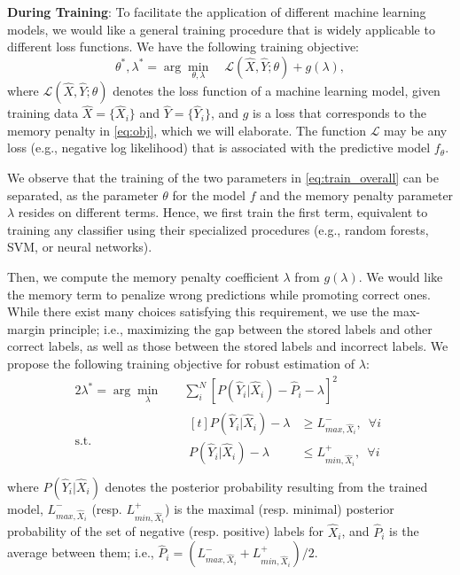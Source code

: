 \documentclass[letterpaper]{article} %
\begin{document}
\textbf{During Training}: To facilitate the application of different machine learning models, we  would like a general training procedure that is widely applicable to different loss functions. We have the following training objective: 
\begin{equation}
\label{eq:train_overall}
\theta^*, \lambda^* = \arg\min_{\theta,\lambda}  \quad \mathcal{L}(\hat{X},\hat{Y};\theta) + g(\lambda),
\end{equation}
where $\mathcal{L}(\hat{X},\hat{Y}; \theta)$ denotes the loss function of a machine learning model, given training data $\hat{X}=\{\hat{X}_i\}$ and $\hat{Y}=\{\hat{Y}_i\}$, and $g$ is a loss that corresponds to the memory penalty in \eqref{eq:obj}, which we will elaborate. The function $\mathcal{L}$ may be any loss (e.g., negative log likelihood) that is associated with the predictive model $f_{\theta}$.

We observe that the training of the two parameters in \eqref{eq:train_overall} can be separated, as the parameter $\theta$ for the model $f$ and the memory penalty parameter $\lambda$ resides on different terms. Hence, we first train the first term, equivalent to training any classifier using their specialized procedures (e.g., random forests, SVM, or neural networks). 

Then, we compute the memory penalty coefficient $\lambda$ from $g(\lambda)$. We would like the memory term to penalize wrong predictions while promoting correct ones. While there exist many  choices satisfying this requirement, we use the max-margin principle; i.e., maximizing the gap between the stored labels and other correct labels, as well as those between the stored labels and incorrect labels. We propose the following training objective for robust estimation of $\lambda$:
\begin{alignat*}{2}
 \lambda^* = \arg\min_{\lambda}  \quad & \sum_i^N [P(\hat{Y}_i|\hat{X}_i) - \hat{P}_i - \lambda]^2 \\
  \text{s.t.} \quad &  \begin{aligned}[t]
    P(\hat{Y}_i|\hat{X}_i) - \lambda & \ge L^{-}_{max, \hat{X}_i}, \,\,\,\forall i\\
    P(\hat{Y}_i|\hat{X}_i) - \lambda & \le L^{+}_{min, \hat{X}_i}, \,\,\,\forall i\\
  \end{aligned}
\end{alignat*}
where $P(\hat{Y}_i|\hat{X}_i)$ denotes the posterior probability resulting from the trained model, $L^{-}_{max, \hat{X}_i}$ (resp. $L^{+}_{min, \hat{X}_i}$) is the maximal (resp. minimal) posterior probability of the set of negative (resp. positive) labels for  $\hat{X}_i$, and $\hat{P}_i$ is the average between them; i.e., $\hat{P}_i = (L^{-}_{max, \hat{X}_i} + L^{+}_{min, \hat{X}_i})/2$.
\end{document}

